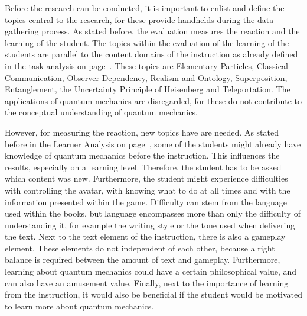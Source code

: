 \documentclass[11pt,twoside]{report} %
\begin{document}
Before the research can be conducted, it is important to enlist and define the topics central to the research, for these provide handhelds during the data gathering process. As stated before, the evaluation measures the reaction and the learning of the student. The topics within the evaluation of the learning of the students are parallel to the content domains of the instruction as already defined in the task analysis on page~\pageref{ch:taskanalysis}. These topics are Elementary Particles, Classical Communication, Observer Dependency, Realism and Ontology, Superposition, Entanglement, the Uncertainty Principle of Heisenberg and Teleportation. The applications of quantum mechanics are disregarded, for these do not contribute to the conceptual understanding of quantum mechanics.

However, for measuring the reaction, new topics have are needed. As stated before in the Learner Analysis on page~\pageref{ch:learneranalysis}, some of the students might already have knowledge of quantum mechanics before the instruction. This influences the results, especially on a learning level. Therefore, the student has to be asked which content was new. Furthermore, the student might experience difficulties with controlling the avatar, with knowing what to do at all times and with the information presented within the game. Difficulty can stem from the language used within the books, but language encompasses more than only the difficulty of understanding it, for example the writing style or the tone used when delivering the text. Next to the text element of the instruction, there is also a gameplay element. These elements do not independent of each other, because a right balance is required between the amount of text and gameplay. Furthermore, learning about quantum mechanics could have a certain philosophical value, and can also have an amusement value. Finally, next to the importance of learning from the instruction, it would also be beneficial if the student would be motivated to learn more about quantum mechanics.
\end{document}
